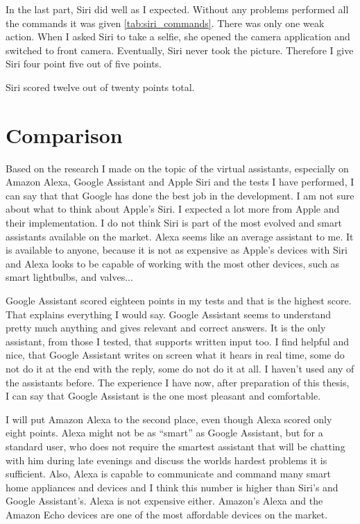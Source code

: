 \documentclass[
  digital, %
  oneside, %
  table,   %
  lof,     %
  lot,     %
]{fithesis3}
\begin{document}
In the last part, Siri did well as I expected. Without any problems performed all the commands it was given \ref{tab:siri_commands}. There was only one weak action. When I asked Siri to take a selfie, she opened the camera application and switched to front camera. Eventually, Siri never took the picture. Therefore I give Siri four point five out of five points.

Siri scored twelve out of twenty points total.

\chapter{Comparison}

Based on the research I made on the topic of the virtual assistants, especially on Amazon Alexa, Google Assistant and Apple Siri and the tests I have performed, I can say that that Google has done the best job in the development. I am not sure about what to think about Apple's Siri. I expected a lot more from Apple and their implementation. I do not think Siri is part of the most evolved and smart assistants available on the market. Alexa seems like an average assistant to me. It is available to anyone, because it is not as expensive as Apple's devices with Siri and Alexa looks to be capable of working with the most other devices, such as smart lightbulbs, and valves...

Google Assistant scored eighteen points in my tests and that is the highest score. That explains everything I would say. Google Assistant seems to understand pretty much anything and gives relevant and correct answers. It is the only assistant, from those I tested, that supports written input too. I find helpful and nice, that Google Assistant writes on screen what it hears in real time, some do not do it at the end with the reply, some do not do it at all. I haven't used any of the assistants before. The experience I have now, after preparation of this thesis, I can say that Google Assistant is the one most pleasant and comfortable.

I will put Amazon Alexa to the second place, even though Alexa scored only eight points. Alexa might not be as ``smart'' as Google Assistant, but for a standard user, who does not require the smartest assistant that will be chatting with him during late evenings and discuss the worlds hardest problems it is sufficient. Also, Alexa is capable to communicate and command many smart home appliances and devices and I think this number is higher than Siri's and Google Assistant's. Alexa is not expensive either. Amazon's Alexa and the Amazon Echo devices are one of the most affordable devices on the market.
\end{document}
